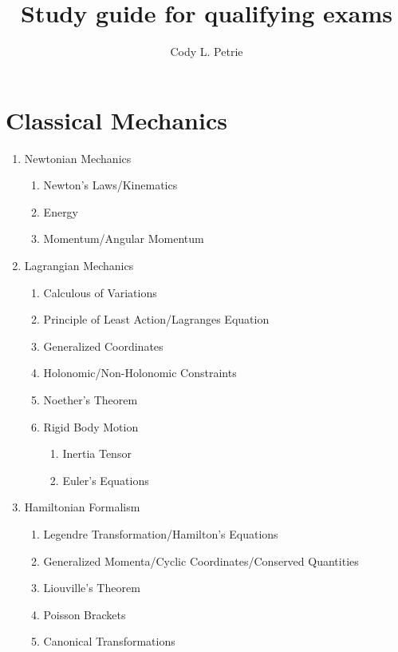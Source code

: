 \documentclass[12pt]{extarticle}
\title{Study guide for qualifying exams}
\author{Cody L. Petrie}
\begin{document}
\maketitle

\section{Classical Mechanics}
\begin{enumerate}
  \item{Newtonian Mechanics}
  \begin{enumerate}
    \item{Newton's Laws/Kinematics}
    \item{Energy}
    \item{Momentum/Angular Momentum}
  \end{enumerate}

  \item{Lagrangian Mechanics}
  \begin{enumerate}
    \item{Calculous of Variations}
    \item{Principle of Least Action/Lagranges Equation}
    \item{Generalized Coordinates}
    \item{Holonomic/Non-Holonomic Constraints}
    \item{Noether's Theorem}
    \item{Rigid Body Motion}
    \begin{enumerate}
      \item{Inertia Tensor}
      \item{Euler's Equations}
    \end{enumerate}
  \end{enumerate}

  \item{Hamiltonian Formalism}
  \begin{enumerate}
    \item{Legendre Transformation/Hamilton's Equations}
    \item{Generalized Momenta/Cyclic Coordinates/Conserved Quantities}
    \item{Liouville's Theorem}
    \item{Poisson Brackets}
    \item{Canonical Transformations}
  \end{enumerate}
\end{enumerate}
\end{document}

